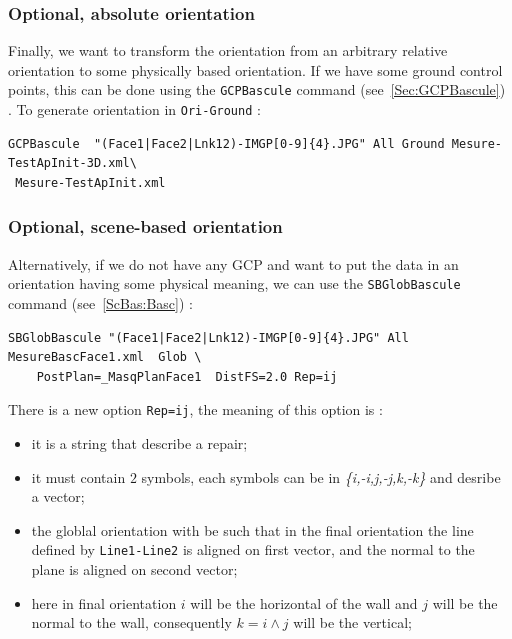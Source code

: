 
\subsubsection{Optional, absolute orientation}

Finally, we want to transform the orientation from an arbitrary relative 
orientation to some physically based orientation. If we have some ground
control points, this can be done using the {\tt GCPBascule} command (see~\ref{Sec:GCPBascule}) . To
generate orientation in {\tt Ori-Ground} :

\begin{verbatim}
GCPBascule  "(Face1|Face2|Lnk12)-IMGP[0-9]{4}.JPG" All Ground Mesure-TestApInit-3D.xml\
 Mesure-TestApInit.xml
\end{verbatim}


\subsubsection{Optional, scene-based orientation}

Alternatively, if we do not have any GCP and want to put the data in an orientation
having some physical meaning, we can use the {\tt SBGlobBascule} command (see~\ref{ScBas:Basc}) :

\begin{verbatim}
SBGlobBascule "(Face1|Face2|Lnk12)-IMGP[0-9]{4}.JPG" All MesureBascFace1.xml  Glob \
    PostPlan=_MasqPlanFace1  DistFS=2.0 Rep=ij
\end{verbatim}

There is a new option {\tt Rep=ij}, the meaning of this option is :
\label{SGB:Rep}

\begin{itemize}
   \item it is a string that describe a repair;
   \item it must contain $2$ symbols, each symbols can be in \emph{\{i,-i,j,-j,k,-k\}} and desribe a vector;
   \item the globlal orientation with be such that in the final orientation the line 
         defined by {\tt Line1-Line2} is aligned on first vector, and the normal to the plane is aligned on second vector;
   \item here in final orientation $i$ will be the horizontal of the wall and $j$ will be the
         normal to the wall, consequently $k=i\wedge j$ will be the vertical;
\end{itemize}


